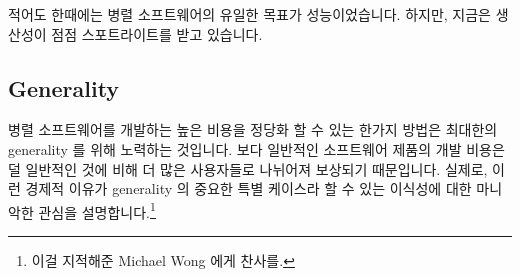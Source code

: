 {%
} \QuickQuizEnd

적어도 한때에는 병렬 소프트웨어의 유일한 목표가 성능이었습니다. 하지만, 지금은
생산성이 점점 스포트라이트를 받고 있습니다.


\subsection{Generality}
\label{sec:intro:Generality}

병렬 소프트웨어를 개발하는 높은 비용을 정당화 할 수 있는 한가지 방법은 최대한의
generality 를 위해 노력하는 것입니다.
보다 일반적인 소프트웨어 제품의 개발 비용은 덜 일반적인 것에 비해 더 많은
사용자들로 나뉘어져 보상되기 때문입니다.
실제로, 이런 경제적 이유가 generality 의 중요한 특별 케이스라 할 수 있는
이식성에 대한 마니악한 관심을 설명합니다.\footnote{
	이걸 지적해준 Michael Wong 에게 찬사를.}


